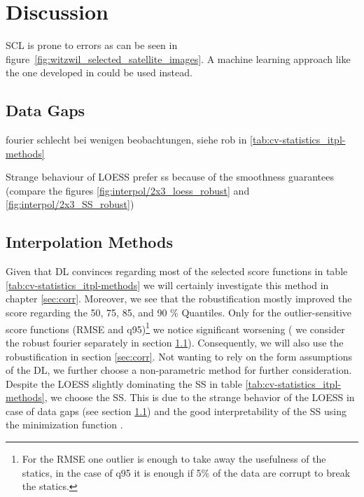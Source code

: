 \chapter{Discussion}

    SCL is prone to errors as can be seen in figure~\ref{fig:witzwil_selected_satellite_images}. A machine learning approach like the one developed in \cite{raiyaniSentinel2ImageScene2021} could be used instead.

\section{Data Gaps}\label{sec:discussion_itpl_data_gaps}
fourier schlecht bei wenigen beobachtungen, siehe rob in \ref{tab:cv-statistics_itpl-methods}

Strange behaviour of LOESS 
prefer ss because of the smoothness guarantees (compare the figures \ref{fig:interpol/2x3_loess_robust} and \ref{fig:interpol/2x3_SS_robust})

\section{Interpolation Methods}{ \label{sec:discussion_itpl}Given that DL convinces regarding most of the selected score functions in table \ref{tab:cv-statistics_itpl-methods} we will certainly investigate this method in chapter \ref{sec:corr}. Moreover, we see that the robustification mostly improved the score regarding the 50, 75, 85, and 90 \% Quantiles. Only for the outlier-sensitive score functions (RMSE and q95)\footnote{For the RMSE one outlier is enough to take away the usefulness of the statics, in the case of q95 it is enough if 5\% of the data are corrupt to break the statics.} we notice significant worsening ( we consider the robust fourier separately in section \ref{sec:discussion_itpl_data_gaps}). Consequently, we will also use the robustification in section \ref{sec:corr}.
Not wanting to rely on the form assumptions of the DL, we further choose a non-parametric method for further consideration. Despite the LOESS slightly dominating the SS in table \ref{tab:cv-statistics_itpl-methods}, we choose the SS. This is due to the strange behavior of the LOESS in case of data gaps (see section \ref{sec:discussion_itpl_data_gaps}) and the good interpretability of the SS using the minimization function .



}

